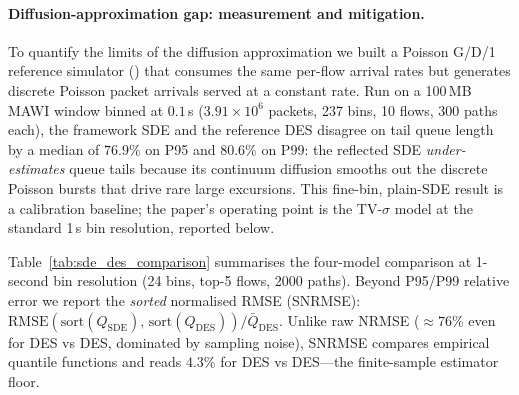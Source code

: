 \documentclass{ieeeaccess}
\begin{document}
\paragraph{Diffusion-approximation gap: measurement and mitigation.}
To quantify the limits of the diffusion approximation we built a Poisson G/D/1 reference simulator
() that consumes the same per-flow arrival rates but
generates discrete Poisson packet arrivals served at a constant rate. Run on a 100\,MB MAWI
window binned at $0.1$\,s ($3.91\!\times\!10^{6}$ packets, 237 bins, 10 flows, 300 paths each),
the framework SDE and the reference DES disagree on tail queue length by a median of $76.9\%$ on
P95 and $80.6\%$ on P99: the reflected SDE \emph{under-estimates} queue tails because its
continuum diffusion smooths out the discrete Poisson bursts that drive rare large excursions.
This fine-bin, plain-SDE result is a calibration baseline; the paper's operating point is the
TV-$\sigma$ model at the standard 1\,s bin resolution, reported below.

Table~\ref{tab:sde_des_comparison} summarises the four-model comparison at 1-second bin
resolution (24 bins, top-5 flows, 2000 paths). Beyond P95/P99 relative error we report the
\emph{sorted} normalised RMSE (SNRMSE): $\mathrm{RMSE}(\mathrm{sort}(Q_{\mathrm{SDE}}),\,\mathrm{sort}(Q_{\mathrm{DES}}))/\bar{Q}_{\mathrm{DES}}$.
Unlike raw NRMSE ($\approx76\%$ even for DES vs DES, dominated by sampling noise),
SNRMSE compares empirical quantile functions and reads $4.3\%$ for DES vs DES---the finite-sample estimator floor.

\begin{table}[h]
\centering
\caption{SDE vs.\ Poisson G/D/1 DES (MAWI 2024-01-01, $N{=}2000$, 5 flows).
  SNRMSE$_k{=}\|\hat{F}_k^{\mathrm{SDE}}-\hat{F}_k^{\mathrm{DES}}\|_2/\bar{Q}_k^{\mathrm{DES}}$;
  DES estimator floor $=4.3\%$.}
\label{tab:sde_des_comparison}
\end{table}
\end{document}
